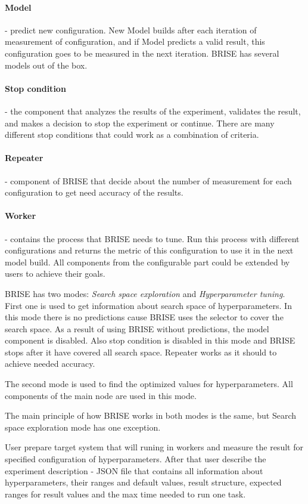	\paragraph{Model} - predict new configuration. New Model builds after each iteration of measurement of configuration, and if Model predicts a valid result, this configuration goes to be measured in the next iteration. BRISE has several models out of the box.
	\paragraph{Stop condition} - the component that analyzes the results of the experiment, validates the result, and makes a decision to stop the experiment or continue. There are many different stop conditions that could work as a combination of criteria.
	\paragraph{Repeater} - component of BRISE that decide about the number of measurement for each configuration to get need accuracy of the results. 
	\paragraph{Worker} - contains the process that BRISE needs to tune. Run this process with different configurations and returns the metric of this configuration to use it in the next model build.
All components from the configurable part could be extended by users to achieve their goals.

BRISE has two modes: \textit{Search space exploration} and \textit{Hyperparameter tuning}.
First one is used to get information about search space of hyperparameters. In this mode there is no predictions cause BRISE uses the selector to cover the search space. As a result of using BRISE without predictions, the model component is disabled. Also stop condition is disabled in this mode and BRISE stops after it have covered all search space. Repeater works as it should to achieve needed accuracy.

The second mode is used to find the optimized values for hyperparameters. All components of the main node are used in this mode.

The main principle of how BRISE works in both modes is the same, but 
Search space exploration mode has one exception.

User prepare target system that will runing in workers and measure the result for specified configuration of hyperparameters.
After that user describe the experiment description - JSON file that contains all information about hyperparameters, their ranges and default values, result structure, expected ranges for result values and the max time needed to run one task.

